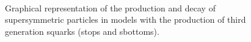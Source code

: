 \begin{figure}[h!]
    \begin{center}
        ~~
        ~~
        ~~
        \caption{
            Graphical representation of the production and decay of
            supersymmetric particles in models with the production of third
            generation squarks (stops and sbottoms).
        }
        \label{fig:simplified-models-feyn-3rdGen}
    \end{center}
\end{figure}

